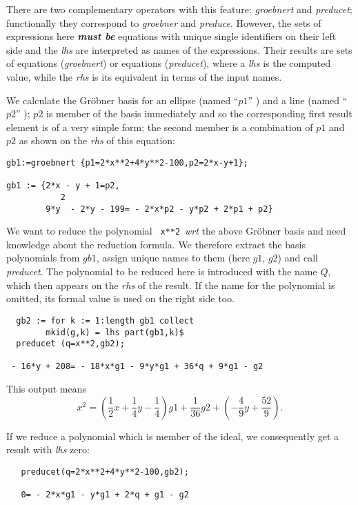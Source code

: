 
There are two complementary operators with this feature: \emph{groebnert}
and \emph{preducet}; functionally they correspond to \emph{groebner} and \emph{preduce}.
However, the sets of expressions here {\it {\bf must be}} equations
with unique single identifiers on their left side and the {\it lhs} are
interpreted as names of the expressions. Their results are
sets of equations (\emph{groebnert}) or equations (\emph{preducet}), where
a {\it lhs} is the computed value, while the {\it rhs} is its equivalent
in terms of the input names.

\example {}

We calculate the Gr\"obner basis for an ellipse (named ``$p1$'' ) and a
line (named ``$p2$'' ); $p2$ is member of the basis immediately and so
the corresponding first result element is of a very simple form; the
second member is a combination of $p1$ and $p2$ as shown on the
{\it rhs} of this equation:

\begin{verbatim}
gb1:=groebnert {p1=2*x**2+4*y**2-100,p2=2*x-y+1};

gb1 := {2*x - y + 1=p2,
           2
        9*y  - 2*y - 199= - 2*x*p2 - y*p2 + 2*p1 + p2}
\end{verbatim}

\example {}

We want to reduce the polynomial \verb+ x**2+\ {\it wrt}
the above Gr\"obner basis and need knowledge about the reduction
formula. We therefore extract the basis polynomials from $gb1$,
assign unique names to them (here $g1$, $g2$) and call \emph{preducet}.
The polynomial to be reduced here is introduced with the name $Q$,
which then appears on the {\it rhs} of the result. If the name for the
polynomial is omitted, its formal value is used on the right side too.

\begin{verbatim}
  gb2 := for k := 1:length gb1 collect
        mkid(g,k) = lhs part(gb1,k)$
  preducet (q=x**2,gb2);

 - 16*y + 208= - 18*x*g1 - 9*y*g1 + 36*q + 9*g1 - g2
\end{verbatim}

This output means
\[
x^2 = (\frac{1}{2} x + \frac{1}{4} y - \frac{1}{4}) g1
 + \frac{1}{36} g2 + (-\frac{4}{9} y + \frac{52}{9}).
\]


\example {}

If we reduce a polynomial which is member of the ideal, we
consequently get a result with {\it lhs} zero:
\begin{verbatim}
   preducet(q=2*x**2+4*y**2-100,gb2);

   0= - 2*x*g1 - y*g1 + 2*q + g1 - g2
\end{verbatim}

